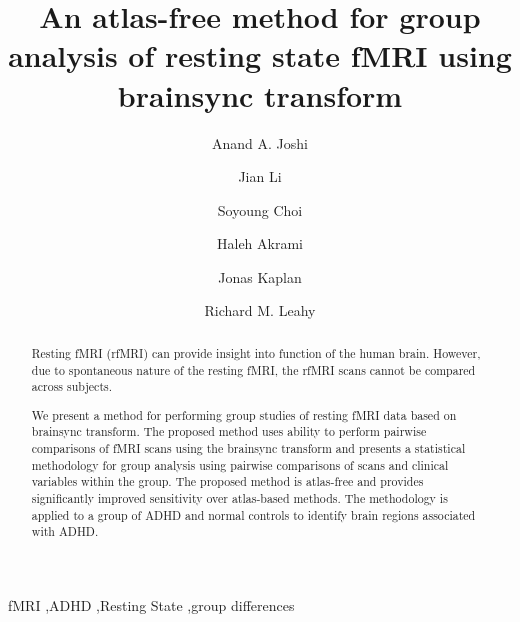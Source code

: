 \documentclass[preprint,12pt]{elsarticle}
\begin{document}
\begin{frontmatter}
\title{An atlas-free method for group analysis of resting state fMRI using brainsync transform}




\author[usc]{Anand A. Joshi}
\author[usc]{Jian Li}
\author[usc]{Soyoung Choi}
\author[usc]{Haleh Akrami}
\author[usc]{Jonas Kaplan}
\author[usc]{Richard M. Leahy}

\address[usc]{University of Southern California, Los Angeles, USA}

\begin{abstract}
Resting fMRI (rfMRI) can provide insight into function of the human brain. However, due to spontaneous nature of the resting fMRI, the rfMRI scans cannot be compared across subjects.

We present a method for performing group studies of resting fMRI data based on brainsync transform. The proposed method uses ability to perform pairwise comparisons of fMRI scans using the brainsync transform and presents a statistical methodology for group analysis using pairwise comparisons of scans and clinical variables within the group. 
The proposed method is atlas-free and provides significantly improved sensitivity over atlas-based methods.
The methodology is applied to a group of ADHD and normal controls to identify brain regions associated with ADHD.

\end{abstract}

\begin{keyword}
fMRI \sep ADHD \sep Resting State \sep group differences
\end{keyword}

\end{frontmatter}
\linenumbers
\end{document}
